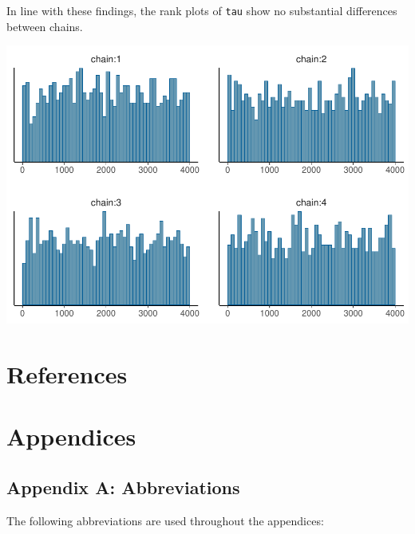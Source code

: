 \documentclass[american,]{article}
\begin{document}
In line with these findings, the rank plots of \texttt{tau} show no
substantial differences between chains.

\includegraphics{graphics/hist-fit-ncp2-1.pdf}

\hypertarget{references}{%
\section*{References}\label{references}}

\hypertarget{refs}{}

\hypertarget{appendices}{%
\section*{Appendices}\label{appendices}}

\hypertarget{AppendixA}{%
\subsection*{Appendix A: Abbreviations}\label{AppendixA}}

The following abbreviations are used throughout the appendices:
\end{document}
